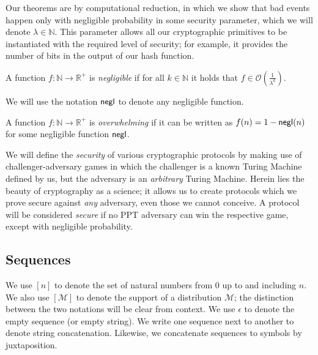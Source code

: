 Our theorems are by computational reduction, in which we show that bad
events happen only with negligible probability in some security parameter, which
we will denote $\lambda \in \mathbb{N}$. This parameter allows all our
cryptographic primitives to be instantiated with the required level of security;
for example, it provides the number of bits in the output of our hash function.

\begin{definition}[Negligible]
  A function $f: \mathbb{N} \longrightarrow \mathbb{R}^+$ is
  \emph{negligible} if for all $k \in \mathbb{N}$ it holds that
  $f \in \mathcal{O}(\frac{1}{\lambda^k})$.
\end{definition}

We will use the notation $\mathsf{negl}$ to denote any negligible function.

\begin{definition}[Overwhelming]
  A function $f: \mathbb{N} \longrightarrow \mathbb{R}^+$ is
  \emph{overwhelming} if it can be written as $f(n) = 1 - \mathsf{negl}(n)$ for
  some negligible function $\mathsf{negl}$.
\end{definition}

We will define the \emph{security} of various cryptographic protocols by making use of challenger-adversary games in which the challenger is a known Turing Machine defined by us, but the adversary is an \emph{arbitrary} Turing Machine. Herein lies the beauty of cryptography as a science; it allows us to create protocols which we prove secure against \emph{any} adversary, even those we cannot conceive. A protocol will be considered \emph{secure} if no PPT adversary can win the respective game, except with negligible probability.

\subsection{Sequences}
We use $[n]$ to denote the set of natural numbers from $0$ up to and including
$n$. We also use $[\mathcal{M}]$ to denote the support of a distribution
$\mathcal{M}$; the distinction between the two notations will be clear from
context.
We use $\epsilon$ to denote the empty sequence (or empty string). We write
one sequence next to another to denote string concatenation. Likewise, we
concatenate sequences to symbols by juxtaposition.

